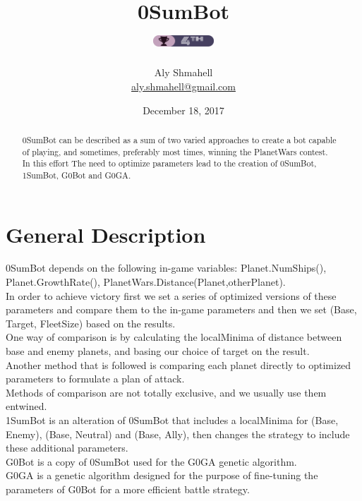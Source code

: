 \documentclass[12pt]{report}
\begin{document}
	\title{%
		0SumBot\\[1ex]
		\includegraphics[width=64pt,height=12pt]{badge.png}
	}
	\author{Aly Shmahell\\%
		\href{aly.shmahell@gmail.com}{aly.shmahell@gmail.com}
	}
	\date{December 18, 2017}
	
	\maketitle
	\begin{abstract}
		0SumBot can be described as a sum of two varied approaches to create a bot capable of playing, and sometimes, preferably most times, winning the PlanetWars contest.\\
		In this effort The need to optimize parameters lead to the creation of 0SumBot, 1SumBot, G0Bot and G0GA.
			\end{abstract}

	\section{\textbf{General Description}}
		0SumBot depends on the following in-game variables: Planet.NumShips(), Planet.GrowthRate(), PlanetWars.Distance(Planet,otherPlanet).\\
		In order to achieve victory first we set a series of optimized versions of these parameters and compare them to the in-game parameters and then we set (Base, Target, FleetSize) based on the results.\\
		One way of comparison is by calculating the localMinima of distance between base and enemy planets, and basing our choice of target on the result.\\
		Another method that is followed is comparing each planet directly to optimized parameters to formulate a plan of attack.\\
		Methods of comparison are not totally exclusive, and we usually use them entwined.\\
		1SumBot is an alteration of 0SumBot that includes a localMinima for (Base, Enemy), (Base, Neutral) and (Base, Ally), then changes the strategy to include these additional parameters.\\
		G0Bot is a copy of 0SumBot used for the G0GA genetic algorithm.\\
		G0GA is a genetic algorithm designed for the purpose of fine-tuning the parameters of G0Bot for a more efficient battle strategy.
\end{document}
